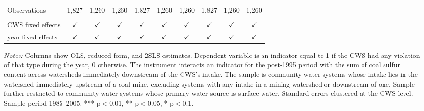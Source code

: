 \begin{table}[htbp]
\begin{adjustbox}{width = \textwidth, center}
\begin{tabular}{lccccccccc}
          \\
         
         Observations                                                         & 1,827         & 1,260         & 1,260         & 1,827         & 1,260         & 1,260         & 1,827         & 1,260         & 1,260\\  
         
          \\
         
         CWS fixed effects                                                    & $\checkmark$  & $\checkmark$  & $\checkmark$  & $\checkmark$  & $\checkmark$  & $\checkmark$  & $\checkmark$  & $\checkmark$  & $\checkmark$\\   
         year fixed effects                                                   & $\checkmark$  & $\checkmark$  & $\checkmark$  & $\checkmark$  & $\checkmark$  & $\checkmark$  & $\checkmark$  & $\checkmark$  & $\checkmark$\\   
         
         \bottomrule
         
      \end{tabular}
      
      
      
   \end{adjustbox}
      {\tiny\linespread{1}\selectfont \par \raggedright 
   \textit{Notes:} Columns show OLS, reduced form, and 2SLS estimates. Dependent variable is an indicator equal to 1 if the CWS had any violation of that type during the year, 0 otherwise. The instrument interacts an indicator for the post-1995 period with the sum of coal sulfur content across watersheds immediately downstream of the CWS's intake. The sample is community water systems whose intake lies in the watershed immediately upstream of a coal mine, excluding systems with any intake in a mining watershed or downstream of one. Sample further restricted to community water systems whose primary water source is surface water. Standard errors clustered at the CWS level. Sample period 1985--2005. *** p$<$0.01, ** p$<$0.05, * p$<$0.1.}
   
\end{table}


